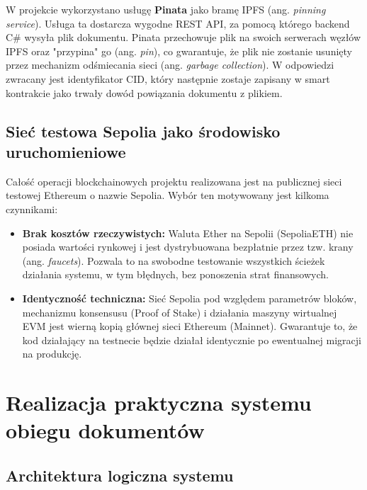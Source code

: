 \documentclass[12pt,a4paper,twoside]{report}
\begin{document}
W projekcie wykorzystano usługę \textbf{Pinata} jako bramę IPFS (ang. \textit{pinning service}). Usługa ta dostarcza wygodne REST API, za pomocą którego backend C\# wysyła plik dokumentu. Pinata przechowuje plik na swoich serwerach węzłów IPFS oraz "przypina" go (ang. \textit{pin}), co gwarantuje, że plik nie zostanie usunięty przez mechanizm odśmiecania sieci (ang. \textit{garbage collection}). W odpowiedzi zwracany jest identyfikator CID, który następnie zostaje zapisany w smart kontrakcie jako trwały dowód powiązania dokumentu z plikiem.

\section{Sieć testowa Sepolia jako środowisko uruchomieniowe}

Całość operacji blockchainowych projektu realizowana jest na publicznej sieci testowej Ethereum o nazwie Sepolia. Wybór ten motywowany jest kilkoma czynnikami:
\begin{itemize}
    \item \textbf{Brak kosztów rzeczywistych:} Waluta Ether na Sepolii (SepoliaETH) nie posiada wartości rynkowej i jest dystrybuowana bezpłatnie przez tzw. krany (ang. \textit{faucets}). Pozwala to na swobodne testowanie wszystkich ścieżek działania systemu, w tym błędnych, bez ponoszenia strat finansowych.
    \item \textbf{Identyczność techniczna:} Sieć Sepolia pod względem parametrów bloków, mechanizmu konsensusu (Proof of Stake) i działania maszyny wirtualnej EVM jest wierną kopią głównej sieci Ethereum (Mainnet). Gwarantuje to, że kod działający na testnecie będzie działał identycznie po ewentualnej migracji na produkcję.
\end{itemize}










\chapter{Realizacja praktyczna systemu obiegu dokumentów}

\section{Architektura logiczna systemu}
\end{document}
